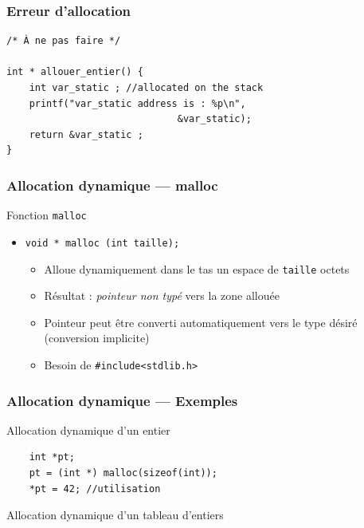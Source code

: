 \documentclass[table,handout,tikz,12pt,svgnames]{beamer}
\begin{document}
\begin{frame}[fragile=singleslide]
\end{frame}








\begin{frame}[fragile=singleslide]
	\frametitle{Erreur d'allocation }
\begin{verbatim}
/* À ne pas faire */	

int * allouer_entier() {
	int var_static ; //allocated on the stack
	printf("var_static address is : %p\n",
							  &var_static);
	return &var_static ;
}			
\end{verbatim}
\end{frame}

\begin{frame}[fragile=singleslide]
	\frametitle{Allocation dynamique --- malloc}
		\begin{block}{Fonction \texttt{malloc}} %
			\begin{itemize}
				\item \texttt{void * malloc (int taille);}
				\begin{itemize}
					\item Alloue dynamiquement dans le tas un espace de \texttt{taille} octets
					\item Résultat : \textit{pointeur non typé} vers la zone allouée
					\item Pointeur peut être converti automatiquement vers le type désiré (conversion implicite)
					\item Besoin de \texttt{\#include<stdlib.h>}
				\end{itemize}
			\end{itemize}
		\end{block}
\end{frame}

\begin{frame}[fragile=singleslide]
	\frametitle{Allocation dynamique --- Exemples}
		\begin{block}{Allocation dynamique d'un entier} %
			\begin{verbatim}			
	int *pt;
	pt = (int *) malloc(sizeof(int));
	*pt = 42; //utilisation
			\end{verbatim}
		\end{block}
		\begin{block}{Allocation dynamique d'un tableau d'entiers}
		\end{block}
\end{frame}
\end{document}

